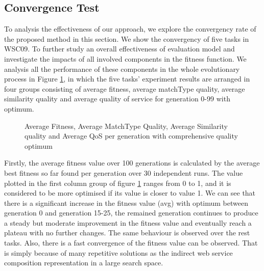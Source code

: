 \documentclass{llncs}
\begin{document}
\subsection{Convergence Test}\label{convergenceTest}
To analysis the effectiveness of our approach, we explore the convergency rate of the proposed method in this section. We show the convergency of five tasks in WSC09. To further study an overall effectiveness of evaluation model and investigate the impacts of all involved components in the fitness function. We analysis all the performance of these components in the whole evolutionary process in Figure \ref{exp_fitnessvalue}, in which the five tasks' experiment results are arranged in four groups consisting of average fitness, average matchType quality, average similarity quality and average quality of service for generation 0-99 with optimum.
\begin{figure}[h]
\centerline{
}
 \caption{Average Fitness, Average MatchType Quality, Average Similarity quality and Average QoS per generation with comprehensive quality optimum}
 \label{exp_fitnessvalue}
\end{figure}

Firstly, the average fitness value over 100 generations is calculated by the average best fitness so far found per generation over 30 independent runs. The value plotted in the first column group of figure \ref{exp_fitnessvalue} ranges from 0 to 1, and it is considered to be more optimised if its value is closer to value 1. We can see that there is a significant increase in the fitness value (avg) with optimum between generation 0 and generation 15-25, the remained generation continues to produce a steady but moderate improvement in the fitness value and eventually reach a plateau with no further changes. The same behaviour is observed over the rest tasks. Also, there is a fast convergence of the fitness value can be observed. That is simply because of many repetitive solutions as the indirect web service composition representation in a large search space.
\end{document}
